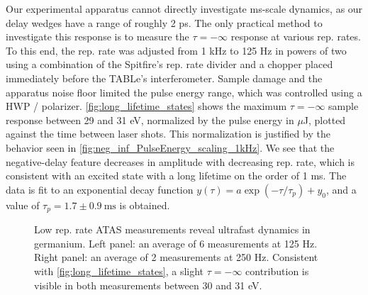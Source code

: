 Our experimental apparatus cannot directly investigate ms-scale dynamics, as our delay wedges have a range of roughly 2 ps. The only practical method to investigate this response is to measure the $\tau = -\infty$ response at various rep. rates. To this end, the rep. rate was adjusted from 1 kHz to 125 Hz in powers of two using a combination of the Spitfire's rep. rate divider and a chopper placed immediately before the TABLe's interferometer. Sample damage and the apparatus noise floor limited the pulse energy range, which was controlled using a HWP / polarizer. \cref{fig:long_lifetime_states} shows the maximum ${\tau=-\infty}$ sample response between 29 and 31 eV, normalized by the pulse energy in $\mu$J, plotted against the time between laser shots. This normalization is justified by the behavior seen in \cref{fig:neg_inf_PulseEnergy_scaling_1kHz}. We see that the negative-delay feature decreases in amplitude with decreasing rep. rate, which is consistent with an excited state with a long lifetime on the order of 1 ms. The data is fit to an exponential decay function ${y(\tau) = a \exp(-\tau/\tau_p) + y_0}$, and a value of ${\tau_p = 1.7 \pm 0.9 \ \textrm{ms}}$ is obtained.

\begin{figure}
	\centering
	\qquad
	\caption{Low rep. rate ATAS measurements reveal ultrafast dynamics in germanium. Left panel: an average of 6 measurements at 125 Hz. Right panel: an average of 2 measurements at 250 Hz. Consistent with \cref{fig:long_lifetime_states}, a slight $\tau=-\infty$ contribution is visible in both measurements between 30 and 31 eV.}
	\label{fig:125vs250Hz_Ge_ATAS:delay}
\end{figure}

